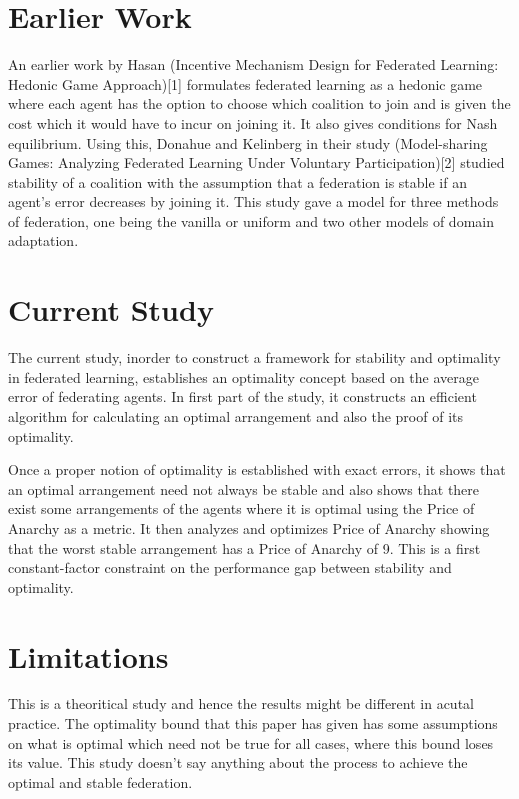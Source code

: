 \documentclass{article}
\begin{document}
\section{Earlier Work}
An earlier work by Hasan (Incentive Mechanism Design for Federated Learning: Hedonic
Game Approach)[1] formulates federated learning as a hedonic game where each agent has the option to choose which coalition to join and is given the cost which it would have to incur on joining it. It also gives conditions for Nash equilibrium. Using this, Donahue and Kelinberg in their study (Model-sharing Games:
Analyzing Federated Learning Under Voluntary Participation)[2] studied stability of a coalition with the assumption that a federation is stable if an agent's error decreases by joining it. This study gave a model for three methods of federation, one being the vanilla or uniform and two other models of domain adaptation.

\section{Current Study}
The current study, inorder to construct a framework for stability and optimality in federated learning, establishes an optimality concept based on the average error of federating agents. In first part of the study, it constructs an efficient algorithm for calculating an optimal arrangement and also the proof of its optimality.

Once a proper notion of optimality is established with exact errors, it shows that an optimal arrangement need not always be stable and also shows that there exist some arrangements of the agents where it is optimal using the Price of Anarchy as a metric. It then analyzes and optimizes Price of Anarchy showing that the worst stable arrangement has a Price of Anarchy of 9. This is a first constant-factor constraint on the performance gap between stability and optimality.

\section{Limitations}
This is a theoritical study and hence the results might be different in acutal practice. The optimality bound that this paper has given has some assumptions on what is optimal which need not be true for all cases, where this bound loses its value. This study doesn't say anything about the process to achieve the optimal and stable federation.
\end{document}

